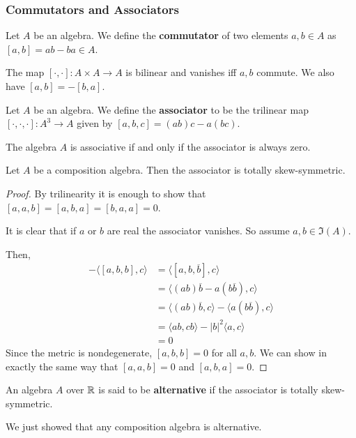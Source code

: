 \subsubsection{Commutators and Associators}
\begin{defn}
    Let $A$ be an algebra. We define the \textbf{commutator} of two elements $a,b \in A$ as $[a,b] = ab-ba \in A$.
\end{defn}
\begin{remark*}
    The map $[\cdot,\cdot] : A\times A \to A$ is bilinear and vanishes iff $a,b$ commute. We also have $[a,b]=-[b,a]$.
\end{remark*}
\begin{defn}
Let $A$ be an algebra.
We define the \textbf{associator} to be the trilinear map $[\cdot,\cdot,\cdot] : A^3 \to A$ given by $[a,b,c] = (ab)c-a(bc)$.
\end{defn}
\begin{remark*}
    The algebra $A$ is associative if and only if the associator is always zero.
\end{remark*}
\begin{lemma}
    Let $A$ be a composition algebra. Then the associator is totally skew-symmetric.
\end{lemma}
\begin{proof}
    By trilinearity it is enough to show that $[a,a,b]=[a,b,a]=[b,a,a]=0$.

    It is clear that if $a$ or $b$ are real the associator vanishes. So assume $a,b\in \Im(A)$.

    Then,
    \begin{align*}
        -\langle [a,b,b],c\rangle &= \langle[a,b,\overline{b}],c\rangle\\
        &= \langle(ab)\overline{b}-a(b\overline{b}),c\rangle\\
        &= \langle (ab)\overline{b},c\rangle -\langle a(b\overline{b}),c\rangle\\
        &= \langle ab,cb\rangle - |b|^2 \langle a,c\rangle\\
        &= 0
    \end{align*}
    Since the metric is nondegenerate, $[a,b,b]=0$ for all $a,b$. We can show in exactly the same way that $[a,a,b]=0$ and $[a,b,a]=0$.
\end{proof}
\begin{defn}
    An algebra $A$ over $\operatorname{\mathbb{R}}$ is said to be \textbf{alternative} if the associator is totally skew-symmetric.
\end{defn}
\begin{remark*}
    We just showed that any composition algebra is alternative.
\end{remark*}
